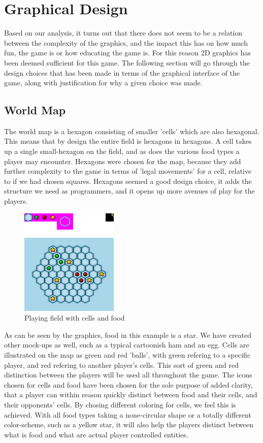 \section{Graphical Design}
\label{sec:graphical_design}

Based on our analysis, it turns out that there does not seem to be a relation between the complexity of the graphics, and the impact this has on how much fun, the game is or how educating the game is.
For this reason 2D graphics has been deemed sufficient for this game.
The following section will go through the design choices that has been made in terms of the graphical interface of the game, along with justification for why a given choice was made.

\subsection{World Map}
The world map is a hexagon consisting of smaller 'cells' which are also hexagonal.
This means that by design the entire field is hexagons in hexagons. 
A cell takes up a single small-hexagon on the field, and as does the various food types a player may encounter.
Hexagons were chosen for the map, because they add further complexity to the game in terms of 'legal movements' for a cell, relative to if we had chosen squares.
Hexagons seemed a good design choice, it adds the structure we need as programmers, and it opens up more avenues of play for the players.\newline

\begin{figure}[h]
	\centering
		\includegraphics{img/cells_mockup.png}
	\caption{Playing field with cells and food}
	\label{fig:cells_mockup}
\end{figure}

As can be seen by the graphics, food in this example is a star.
We have created other mock-ups as well, such as a typical cartoonish ham and an egg. 
Cells are illustrated on the map as green and red 'balls', with green refering to a specific player, and red refering to another player's cells.
This sort of green and red distinction between the players will be used all throughout the game.
The icons chosen for cells and food have been chosen for the sole purpose of added clarity, that a player can within reason quickly distinct between food and their cells, and their opponents' cells.
By chosing different coloring for cells, we feel this is achieved.
With all food types taking a none-circular shape or a totally different color-scheme, such as a yellow star, it will also help the players distinct between what is food and what are actual player controlled entities.

